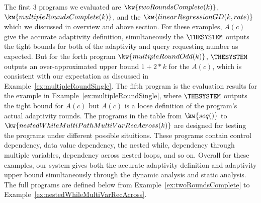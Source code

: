The first 3 programs we evaluated are $ \kw{twoRoundsComplete(k)}$, $ \kw{multipleRoundsComplete(k)}$, 
and the $\kw{linearRegressionGD(k, rate)}$ which we discussed in overview and above section.
For these examples, $A(c)$ 
give the accurate adaptivity definition, 
simultaneously the $\THESYSTEM$ outputs the tight bounds for both of the adaptivity and query requesting number as expected.
But for the forth program $\kw{multipleRoundOdd(k)}$, $\THESYSTEM$ outputs an over-approximated upper bound $1 + 2*k$ for the $A(c)$, 
which is consistent with our expectation as discussed in Example~\ref{ex:multipleRoundSingle}. 
The fifth program is the evaluation results for the example in Example~\ref{ex:multipleRoundSingle}, where $\THESYSTEM$ outputs
the tight bound for $A(c)$ but $A(c)$ is a loose definition of the program's actual adaptivity rounds.
%
The programs in the table from  $\kw{seq()}$ to $ \kw{nestedWhileMultiPathMultiVarRecAcross(k)}$ are 
designed for testing the programs under different possible situitions.
These programs contain control dependency, data value dependency,
the nested while, dependency through multiple variables, dependency across nested loops, and so on. 
Overall for these examples, our system gives both the accurate adaptivity definition and 
adaptivity upper bound simultaneously through the dynamic analysis and 
static analysis.
The full programs are defined below from Example~\ref{ex:twoRoundsComplete} to Example~\ref{ex:nestedWhileMultiVarRecAcross}.
%
